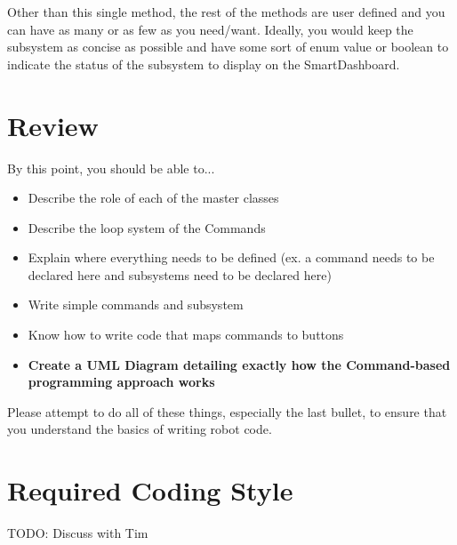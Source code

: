 \documentclass[11pt,fleqn]{article}
\begin{document}
Other than this single method, the rest of the methods are user defined and you can have as many or
as few as you need/want. Ideally, you would keep the subsystem as concise as possible and have some
sort of enum value or boolean to indicate the status of the subsystem to display on the
SmartDashboard. 

\section{Review}
By this point, you should be able to...
\begin{itemize}
\item
Describe the role of each of the master classes
\item
Describe the loop system of the Commands
\item
Explain where everything needs to be defined (ex. a command needs to be declared here and
subsystems need to be declared here)
\item
Write simple commands and subsystem
\item
Know how to write code that maps commands to buttons
\item
\textbf{Create a UML Diagram detailing exactly how the Command-based programming approach works}
\end{itemize}

Please attempt to do all of these things, especially the last bullet, to ensure that you understand
the basics of writing robot code. 

\section{Required Coding Style}
TODO: Discuss with Tim
\end{document}
